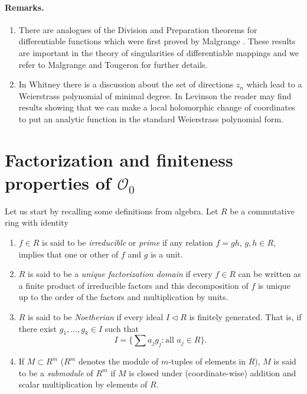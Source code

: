 \paragraph*{Remarks.}
\begin{enumerate}
\item There are analogues of the Division and Preparation theorems for differentiable functions which were first proved by Malgrange \cite{bib:I:malgrange-b:1}.
These results are important in the theory of singularities of differentiable mappings and we refer to Malgrange \cite{bib:I:malgrange-b:1} and Tougeron \cite{bib:I:tougeron-j-c-p:1} for further details.
\item In Whitney \cite[\S10]{bib:I:whitney-h:2} there is a discussion about the set of directions $z_n$ which lead to a Weierstrass polynomial of minimal degree. In Levinson \cite{bib:I:levinson-n:1,bib:I:levinson-n:2} the reader may find results showing that we can make a local holomorphic change of coordinates to put an analytic function in the standard Weierstrass polynomial form.
\end{enumerate}
\section{\texorpdfstring{Factorization and finiteness properties of $\mathcal O_0$}{Factorization and finiteness properties of O0}}\label{sec:3:3}
Let us start by recalling some definitions from algebra.
 Let $R$ be a commutative ring with identity
\begin{enumerate}
\item $f\in R$ is said to be \emph{irreducible} or \emph{prime} if any relation $f=gh$, $g,h\in R$, implies that one or other of $f$ and $g$ is a unit.
\item $R$ is said to be a \emph{unique factorization domain} if every $f\in R$ can be written as a finite product of irreducible factors and this decomposition of $f$ is unique up to the order of the factors and multiplication by units.
\item $R$ is said to be \emph{Noetherian} if every ideal $I\lhd R$ is finitely generated. That is, if there exist $g_1,\ldots,g_k\in I$ such that
\[I=\{\textstyle\sum a_jg_j:\text{all }a_j\in R\}.\]
\item If $M\subset R^m$ ($R^m$ denotes the module of $m$-tuples of elements in $R$), $M$ is said to be a \emph{submodule} of $R^m$ if $M$ is closed under (coordinate-wise) addition and scalar multiplication by elements of $R$.
\end{enumerate}
